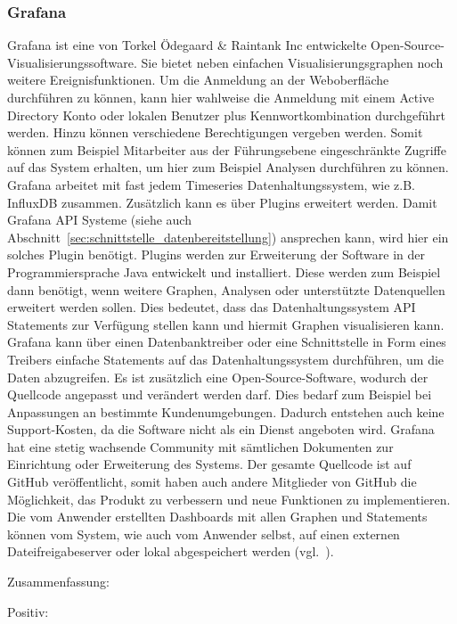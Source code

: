 {\subsubsection{Grafana}
\label{subsubsec:grafana}
Grafana ist eine von Torkel Ödegaard \& Raintank Inc entwickelte
Open\hyp{}Source\hyp{}Visualisierungssoftware. Sie bietet neben einfachen
Visualisierungsgraphen noch weitere Ereignisfunktionen. Um die Anmeldung an der
Weboberfläche durchführen zu können, kann hier wahlweise die Anmeldung mit
einem \gls{Active Directory} Konto oder lokalen Benutzer plus
Kennwortkombination durchgeführt werden. Hinzu können verschiedene
Berechtigungen vergeben werden. Somit können zum Beispiel Mitarbeiter aus der
Führungsebene eingeschränkte Zugriffe auf das System erhalten, um hier zum
Beispiel Analysen durchführen zu können. Grafana arbeitet mit fast jedem
Timeseries Datenhaltungssystem, wie z.B. InfluxDB zusammen. Zusätzlich kann es
über Plugins erweitert werden. Damit Grafana API Systeme (siehe auch
Abschnitt~\ref{sec:schnittstelle_datenbereitstellung}) ansprechen kann, wird
hier ein solches Plugin benötigt. Plugins werden zur Erweiterung der Software
in der Programmiersprache Java entwickelt und installiert. Diese werden zum
Beispiel dann benötigt, wenn weitere Graphen, Analysen oder unterstützte
Datenquellen erweitert werden sollen. Dies bedeutet, dass das
Datenhaltungssystem API Statements zur Verfügung stellen kann und hiermit
Graphen visualisieren kann. Grafana kann über einen \gls{Datenbanktreiber} oder
eine Schnittstelle in Form eines Treibers einfache Statements auf das
Datenhaltungssystem durchführen, um die Daten abzugreifen. Es ist zusätzlich
eine Open\hyp{}Source\hyp{}Software, wodurch der Quellcode angepasst und
verändert werden darf. Dies bedarf zum Beispiel bei Anpassungen an bestimmte
Kundenumgebungen.  Dadurch entstehen auch keine Support\hyp{}Kosten, da die
Software nicht als ein Dienst angeboten wird. Grafana hat eine stetig wachsende
Community mit sämtlichen Dokumenten zur Einrichtung oder Erweiterung des
Systems. Der gesamte Quellcode ist auf GitHub veröffentlicht, somit haben auch
andere Mitglieder von GitHub die Möglichkeit, das Produkt zu verbessern und
neue Funktionen zu implementieren. Die vom Anwender erstellten Dashboards mit
allen Graphen und Statements können vom System, wie auch vom Anwender selbst,
auf einen externen Dateifreigabeserver oder lokal abgespeichert werden
(vgl.~\cite{grafana}).

Zusammenfassung:

Positiv:

}
